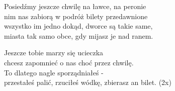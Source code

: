 \begin{text}
    Posiedźmy jeszcze chwilę na ławce, na peronie\\
    nim nas zabiorą w podróż bilety przedawnione\\
    wszystko im jedno dokąd, dworce są takie same,\\
    miasta tak samo obce, gdy mijasz je nad ranem.

    Jeszcze tobie marzy się ucieczka\\
    chcesz zapomnieć o nas choć przez chwilę.\\
    To dlatego nagle sporządniałeś -\\
    przestałeś palić, rzuciłeś wódkę, zbierasz an bilet. (2x)
\end{text}
\begin{chord}

\end{chord}